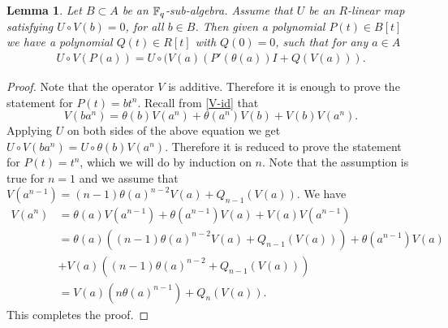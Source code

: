 \documentclass{amsart}
\newtheorem {lemma}[theorem] {\bf Lemma}
\numberwithin {equation}{section}
\begin{document}
\begin{lemma}\label{lemma-V-op}Let $B\subset A$ be an $\mathbb{F}_{q}$-sub-algebra. Assume that $U$ be an $R$-linear map satisfying $U\circ V(b)=0$, for all $b\in B$. Then given a polynomial $P(t)\in B[t]$ we have a polynomial $Q(t)\in R[t]$ with $Q(0)=0$, such that for any $a\in A$ 
 \begin{align*}
U\circ V(P(a))=U\circ (V(a)(P'(\theta (a))I+ Q(V(a))).
\end{align*}
\end{lemma}
\begin{proof}
Note that the operator $V$ is additive. Therefore it is enough to prove the statement for $P(t)=bt^{n}$. Recall from \eqref{V-id} that 
$$V(ba^{n})=\theta(b)V(a^{n})+\theta(a^{n})V(b)+V(b)V(a^{n}).$$
Applying $U$ on both sides of the above equation we get $U\circ V(ba^{n})=U\circ \theta(b)V(a^{n})$. Therefore it is reduced to prove the statement for $P(t)=t^{n}$, which we will do by induction on $n$. Note that the assumption is true for $n=1$ and we assume that $V(a^{n-1})=(n-1)\theta(a)^{n-2}V(a)+Q_{n-1}(V(a))$. We have 
\begin{align*}
V(a^{n})&=\theta(a)V(a^{n-1})+\theta(a^{n-1})V(a)+V(a)V(a^{n-1})\\
        &=\theta(a)((n-1)\theta(a)^{n-2}V(a)+Q_{n-1}(V(a)))+\theta(a^{n-1})V(a)\\
        &+V(a)((n-1)\theta(a)^{n-2}+Q_{n-1}(V(a)))\\
        &=V(a)(n\theta(a)^{n-1})+ Q_{n}(V(a)). 
\end{align*}
This completes the proof.
\end{proof}
\end{document}
